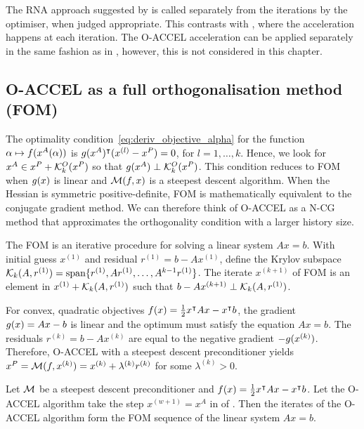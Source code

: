 \documentclass[main.tex]{subfiles}
\begin{document}
\begin{remark}
  The RNA approach suggested by \citet{damien2016regularized} is
  called separately from the iterations by the optimiser, when judged
  appropriate. This contrasts with , where the
  acceleration happens at each iteration.  The O-ACCEL acceleration
  can be applied separately in the same fashion as in
  \citet{damien2016regularized}, however, this is not considered in
  this chapter.
\end{remark}

\subsection{O-ACCEL as a full orthogonalisation method (FOM)}
The optimality condition~\eqref{eq:deriv_objective_alpha} for the
function $\alpha\mapsto f(x^A(\alpha))$ is
$g(x^A)^\intercal(x^{(l)}-x^P)=0$, for $l=1,\dots,k$.  Hence, we
look for $x^A\in x^P+\mathcal{K}_{k}^O(x^P)$ so that
$g(x^A)\perp \mathcal{K}_{k}^O(x^P)$.  This condition reduces to FOM
\citep{saad2003iterative} when $g(x)$ is linear and
$\mathcal{M}(f,x)$ is a steepest descent algorithm.  When the Hessian
is symmetric positive-definite, FOM is mathematically equivalent to
the conjugate gradient method. We can therefore think of O-ACCEL as a
N-CG method that approximates the orthogonality condition with a
larger history size.

The FOM is an iterative procedure for solving a linear system $Ax=b$.
With initial guess $x^{(1)}$ and residual $r^{(1)}=b-Ax^{(1)}$, define
the Krylov subspace
$\mathcal{K}_{k}(A,r^{(1)})=\mbox{span} \{r^{(1)},Ar^{(1)},\dots,A^{k-1}r^{(1)}\}$.
The iterate $x^{(k+1)}$ of FOM is an element in $x^{(1)}+\mathcal{K}_{k}(A,r^{(1)})$
such that $b-Ax^{(k+1)}\perp \mathcal{K}_{k}(A,r^{(1)})$.

For convex, quadratic objectives
$f(x)=\frac{1}{2}x^\intercal Ax-x^\intercal b$, the gradient
$g(x)=Ax-b$ is linear and the optimum must satisfy the equation
$Ax=b$.  The residuals $r^{(k)}=b-Ax^{(k)}$ are equal to the negative
gradient $-g(x^{(k)})$. Therefore, O-ACCEL with a steepest descent
preconditioner yields
$x^P = \mathcal{M}(f,x^{(k)}) = x^{(k)}+\lambda^{(k)}r^{(k)}$ for some
$\lambda^{(k)}>0$.

\begin{theorem}\label{thm:oaccel_fom}
  Let $\mathcal{M}$ be a steepest descent preconditioner and
  $f(x)=\frac{1}{2}x^\intercal Ax-x^\intercal b$.  Let the
  O-ACCEL algorithm take the step $x^{(w+1)}=x^A$ in
   of .  Then the iterates of
  the O-ACCEL algorithm form the FOM sequence of the linear system
  $Ax=b$.
\end{theorem}
\end{document}
